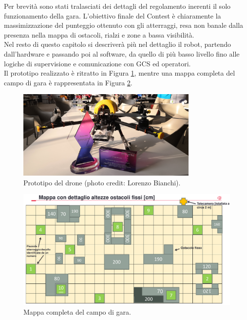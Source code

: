 Per brevità sono stati tralasciati dei dettagli del regolamento inerenti il solo funzionamento della gara. L'obiettivo finale del Contest è chiaramente la massimizzazione del punteggio ottenuto con gli atterraggi, resa non banale dalla presenza nella mappa di ostacoli, rialzi e zone a bassa visibilità.\\
Nel resto di questo capitolo si descriverà più nel dettaglio il robot, partendo dall'hardware e passando poi al software, da quello di più basso livello fino alle logiche di supervisione e comunicazione con GCS ed operatori.\\
Il prototipo realizzato è ritratto in Figura \ref{fig:drone}, mentre una mappa completa del campo di gara è rappresentata in Figura \ref{fig:map}.

\begin{figure}
    \centering
    \includegraphics[width=0.8\textwidth]{figs/chapter3/drone.jpg}
    \caption{Prototipo del drone (photo credit: Lorenzo Bianchi).}
    \label{fig:drone}
\end{figure}

\begin{figure}
    \centering
    \includegraphics[scale=0.3]{figs/chapter3/campogara.png}
    \caption{Mappa completa del campo di gara.}
    \label{fig:map}
\end{figure}
\clearpage

